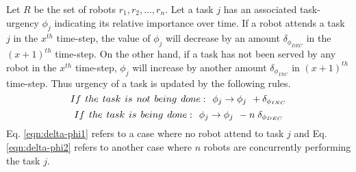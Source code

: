 Let $R$ be the set of robots ${r_1, r_2,...,r_n}$. Let a task $j$ has an associated task-urgency $\phi_j$ indicating its relative importance over time.
If a robot attends a task $j$ in the $x^{th}$ time-step, the value of $\phi_j$ will decrease by an amount $\delta_{\phi_{DEC}}$ in the $(x+1)^{th}$ time-step.
On the other hand, if a task has not been served by any robot in the $x^{th}$ time-step, $\phi_j$ will increase by another amount  $\delta_{\phi_{INC}}$  in $(x+1)^{th}$ time-step. Thus
urgency of a task is updated by the following rules.
\begin{equation}
 If\hspace*{0.15cm}the\hspace*{0.15cm} task\hspace*{0.15cm}is\hspace*{0.15cm}not\hspace*{0.15cm}being\hspace*{0.15cm} done:\hspace*{0.15cm}  \phi_j \rightarrow   \phi_j \hspace*{0.15cm} + \delta_{\phi_{INC}}
\label{eqn:delta-phi1}
\end{equation}
\begin{equation}
 If\hspace*{0.15cm}the \hspace*{0.15cm}task\hspace*{0.15cm}is\hspace*{0.15cm}being\hspace*{0.15cm}done:\hspace*{0.15cm}  \phi_j \rightarrow   \phi_j \hspace*{0.15cm} - n\hspace*{0.10cm}\delta_{\phi_{DEC}}
\label{eqn:delta-phi2}
\end{equation}
Eq. \ref{eqn:delta-phi1} refers to a case where no robot attend to task $j$ and Eq. \ref{eqn:delta-phi2} refers to another case where $n$ robots are concurrently performing the task $j$.

